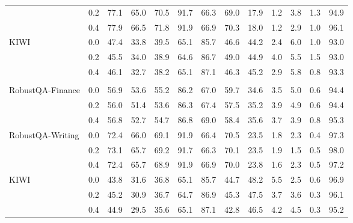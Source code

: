 \begin{table}[h]
{\begin{tabular}{lcccccccccccc}
& 0.2 & 77.1 & 65.0 & 70.5 & 91.7 & 66.3 & 69.0 & 17.9 & 1.2 & 3.8 & 1.3 & 94.9 \\
& 0.4 & 77.9 & 66.5 & 71.8 & 91.9 & 66.9 & 70.3 & 18.0 & 1.2 & 2.9 & 1.0 & 96.1 \\
\multirow{3}{*}{KIWI} & 0.0 & 47.4 & 33.8 & 39.5 & 65.1 & 85.7 & 46.6 & 44.2 & 2.4 & 6.0 & 1.0 & 93.0 \\
& 0.2 & 45.5 & 34.0 & 38.9 & 64.6 & 86.7 & 49.0 & 44.9 & 4.0 & 5.5 & 1.5 & 93.0 \\
& 0.4 & 46.1 & 32.7 & 38.2 & 65.1 & 87.1 & 46.3 & 45.2 & 2.9 & 5.8 & 0.8 & 93.3 \\
\rowcolor{Blue}
\multicolumn{13}{c}{\textbf{E5-Mistral + Llama3 70B}} \\
\multirow{3}{*}{RobustQA-Finance} & 0.0 & 56.9 & 53.6 & 55.2 & 86.2 & 67.0 & 59.7 & 34.6 & 3.5 & 5.0 & 0.6 & 94.4 \\
& 0.2 & 56.0 & 51.4 & 53.6 & 86.3 & 67.4 & 57.5 & 35.2 & 3.9 & 4.9 & 0.6 & 94.4 \\
& 0.4 & 56.8 & 52.7 & 54.7 & 86.8 & 69.0 & 58.4 & 35.6 & 3.7 & 3.9 & 0.8 & 95.3 \\
\multirow{3}{*}{RobustQA-Writing} & 0.0 & 72.4 & 66.0 & 69.1 & 91.9 & 66.4 & 70.5 & 23.5 & 1.8 & 2.3 & 0.4 & 97.3 \\
& 0.2 & 73.1 & 65.7 & 69.2 & 91.7 & 66.3 & 70.1 & 23.5 & 1.9 & 1.5 & 0.5 & 98.0 \\
& 0.4 & 72.4 & 65.7 & 68.9 & 91.9 & 66.9 & 70.0 & 23.8 & 1.6 & 2.3 & 0.5 & 97.2 \\
\multirow{3}{*}{KIWI} & 0.0 & 43.8 & 31.6 & 36.8 & 65.1 & 85.7 & 44.7 & 48.2 & 5.5 & 2.5 & 0.6 & 96.9 \\
& 0.2 & 45.2 & 30.9 & 36.7 & 64.7 & 86.9 & 45.3 & 47.5 & 3.7 & 3.6 & 0.3 & 96.1 \\
& 0.4 & 44.9 & 29.5 & 35.6 & 65.1 & 87.1 & 42.8 & 46.5 & 4.2 & 4.5 & 0.3 & 95.2 \\
\bottomrule
\end{tabular}
}
\end{table}

